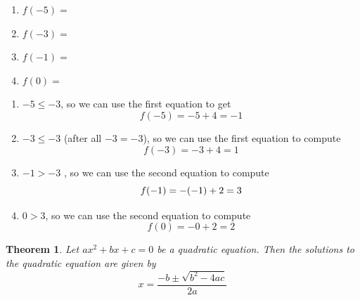 \documentclass[addpoints,12pt]{exam}
\newtheorem{theorem}{Theorem}
\begin{document}
\begin{questions}
\begin{enumerate}[label = \alph*)]
    \item $f(-5)=$
		\item $f(-3) = $
		\item $f(-1)= $
		\item $f(0)=$
\end{enumerate}

\begin{solution}
    \begin{enumerate}
        \item $-5 \leq -3$, so we can use the first equation to get \[
        f(-5) = -5 +4 = -1 
        \]
			\item $-3 \leq -3$ (after all $-3 = -3$), so we can use the first equation to compute \[f(-3)= -3+4 =1 \]
			\item $-1 > -3 $ , so we can use the second equation to compute 
				\[
				f(-1) = -(-1)+2 = 3 \\
				\]
		\item $0>3$, so we can use the second equation to compute \[f(0) = -0+2 = 2 \]
    \end{enumerate}
\end{solution}

\end{questions}

\begin{theorem}
    Let $ax^{2}+bx +c =0$ be a quadratic equation. Then the solutions to the quadratic equation are given by 
		\[
		x = \frac{-b \pm \sqrt{b^{2} - 4ac}}{2a}
		\]
\end{theorem}
\end{document}
